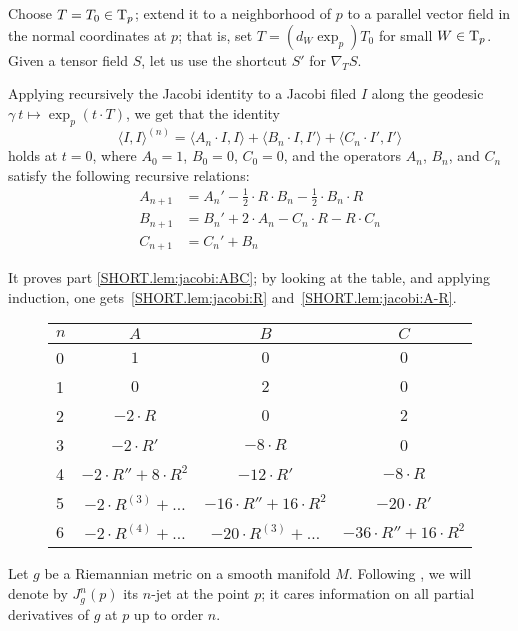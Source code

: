 \documentclass[a4paper,10pt]{article}
\begin{document}
Choose $T=T_0\in\mathrm{T}_p$;
extend it to a neighborhood of $p$ to a parallel vector field in the normal coordinates at $p$;
that is, set $T=(d_W\exp_p)T_0$ for small $W\in \mathrm{T}_p$.
Given a tensor field $S$, let us use the shortcut $S'$  for $\nabla_TS$.

Applying recursively the Jacobi identity to a Jacobi filed $I$ along the geodesic $\gamma\:t\mapsto\exp_p(t\cdot T)$, we get that the identity 
\[\langle I,I\rangle^{(n)}
=
\langle A_n\cdot  I,I\rangle+ \langle B_n\cdot I,I'\rangle+\langle C_n\cdot I',I'\rangle\]
holds at $t=0$,
where $A_0=1$, $B_0=0$, $C_0=0$, and the operators $A_n$, $B_n$, and $C_n$ satisfy the following recursive relations:
\begin{align*}
A_{n+1}&=A_n'-\tfrac12\cdot R\cdot B_n-\tfrac12\cdot B_n\cdot R
\\
B_{n+1}&=B_n'+ 2\cdot A_n-C_n\cdot R-R\cdot C_n
\\
C_{n+1}&=C_n'+ B_n
\end{align*}

It proves part \ref{SHORT.lem:jacobi:ABC};
by looking at the table, and applying induction, one gets~\ref{SHORT.lem:jacobi:R} and~\ref{SHORT.lem:jacobi:A-R}.\qeds

\renewcommand{\arraystretch}{1.5}
\begin{figure}[!ht]
\centering
\begin{tabular}{ l|c|c|c }
$n$ & $A$ & $B$ & $C$ \\ \hline
0& $1$   &  $0$  & $0$ \\ \hline
1& $0$   &  $2$  & $0$ \\ \hline 
2& $-2\cdot R$ & $0$ & $2$ \\ \hline 
3& $-2\cdot R'$ & $-8\cdot R$ & 0  \\ \hline 
4& $-2\cdot R''+8\cdot R^2$ & $-12\cdot R'$ & $-8\cdot R$  \\ \hline
5& $-2\cdot R^{(3)}+\dots$ 
& $-16\cdot R''+16\cdot R^2$ & $-20\cdot R'$  \\ \hline
6
&$-2\cdot R^{(4)}+\dots$
&$-20\cdot R^{(3)}+\dots$
&$-36\cdot R''+16\cdot R^2$
\\
\end{tabular}
\end{figure} 

Let $g$ be a Riemannian metric on a smooth manifold $M$.
Following \cite{eliashberg-mishachev}, we will denote by $J^n_g(p)$ its $n$-jet at the point $p$;
it cares information on all partial derivatives of $g$ at $p$ up to order $n$.
\end{document}
